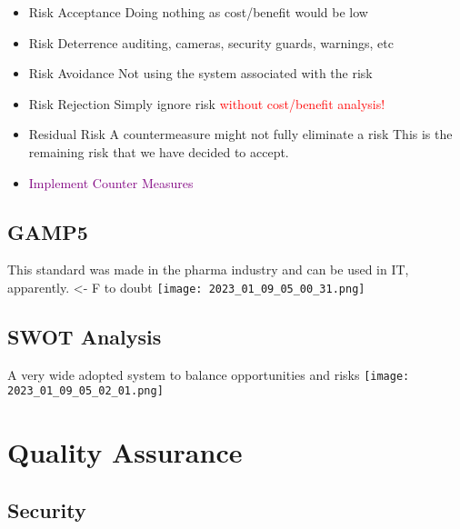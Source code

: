 \documentclass[main.tex,fontsize=12pt,paper=a4,paper=landscape,DIV=calc,]{scrartcl}
\begin{document}
\begin{multicols*}{2}
\begin{itemize}
\begin{itemize}
\item Risk Acceptance Doing nothing as cost/benefit would be low
\item Risk Deterrence auditing, cameras, security guards, warnings, etc
\item Risk Avoidance Not using the system associated with the risk
\item Risk Rejection Simply ignore risk \textcolor{red}{without cost/benefit analysis!}
\item Residual Risk A countermeasure might not fully eliminate a risk\newline 
  This is the remaining risk that we have decided to accept.
\item \textcolor{purple}{Implement Counter Measures}
\end{itemize} 
\end{itemize} 

\subsection{GAMP5}
This standard was made in the pharma industry and can be used in IT, apparently. <- F to doubt\newline
\texttt{[image: 2023\_01\_09\_05\_00\_31.png]}

\subsection{SWOT Analysis}
A very wide adopted system to balance opportunities and risks\newline
\texttt{[image: 2023\_01\_09\_05\_02\_01.png]}

\section{Quality Assurance}

\subsection{Security}

\end{multicols*}
\end{document}

